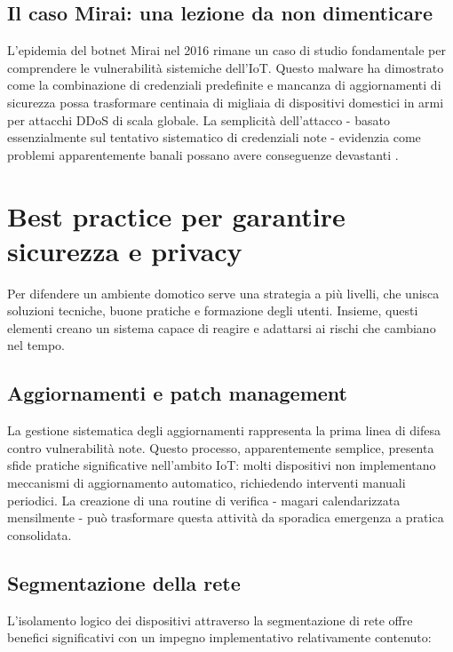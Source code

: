 \subsection{Il caso Mirai: una lezione da non dimenticare}

L'epidemia del botnet Mirai nel 2016 rimane un caso di studio fondamentale per comprendere le vulnerabilità sistemiche dell'IoT. Questo malware ha dimostrato come la combinazione di credenziali predefinite e mancanza di aggiornamenti di sicurezza possa trasformare centinaia di migliaia di dispositivi domestici in armi per attacchi DDoS di scala globale. La semplicità dell'attacco - basato essenzialmente sul tentativo sistematico di credenziali note - evidenzia come problemi apparentemente banali possano avere conseguenze devastanti \parencite{miraiBotnet}.

\section{Best practice per garantire sicurezza e privacy}

Per difendere un ambiente domotico serve una strategia a più livelli, che unisca soluzioni tecniche, buone pratiche e formazione degli utenti. Insieme, questi elementi creano un sistema capace di reagire e adattarsi ai rischi che cambiano nel tempo.

\subsection{Aggiornamenti e patch management}

La gestione sistematica degli aggiornamenti rappresenta la prima linea di difesa contro vulnerabilità note. Questo processo, apparentemente semplice, presenta sfide pratiche significative nell'ambito IoT: molti dispositivi non implementano meccanismi di aggiornamento automatico, richiedendo interventi manuali periodici. La creazione di una routine di verifica - magari calendarizzata mensilmente - può trasformare questa attività da sporadica emergenza a pratica consolidata.

\subsection{Segmentazione della rete}

L'isolamento logico dei dispositivi attraverso la segmentazione di rete offre benefici significativi con un impegno implementativo relativamente contenuto:

